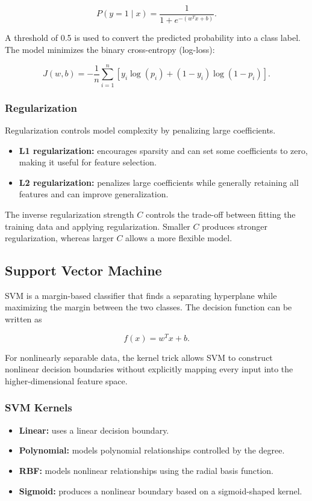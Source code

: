 \documentclass[12pt,a4paper]{article}
\begin{document}
\begin{equation}
P(y=1\mid x)=\frac{1}{1+e^{-(w^Tx+b)}}.
\end{equation}

A threshold of 0.5 is used to convert the predicted probability into a class label. The model minimizes the binary cross-entropy (log-loss):

\begin{equation}
J(w,b)=-\frac{1}{n}\sum_{i=1}^{n}\left[y_i\log(p_i)+(1-y_i)\log(1-p_i)\right].
\end{equation}

\subsubsection*{Regularization}
Regularization controls model complexity by penalizing large coefficients.
\begin{itemize}
    \item \textbf{L1 regularization:} encourages sparsity and can set some coefficients to zero, making it useful for feature selection.
    \item \textbf{L2 regularization:} penalizes large coefficients while generally retaining all features and can improve generalization.
\end{itemize}

The inverse regularization strength \(C\) controls the trade-off between fitting the training data and applying regularization. Smaller \(C\) produces stronger regularization, whereas larger \(C\) allows a more flexible model.

\subsection{Support Vector Machine}
SVM is a margin-based classifier that finds a separating hyperplane while maximizing the margin between the two classes. The decision function can be written as

\begin{equation}
f(x)=w^Tx+b.
\end{equation}

For nonlinearly separable data, the kernel trick allows SVM to construct nonlinear decision boundaries without explicitly mapping every input into the higher-dimensional feature space.

\subsubsection*{SVM Kernels}
\begin{itemize}
    \item \textbf{Linear:} uses a linear decision boundary.
    \item \textbf{Polynomial:} models polynomial relationships controlled by the degree.
    \item \textbf{RBF:} models nonlinear relationships using the radial basis function.
    \item \textbf{Sigmoid:} produces a nonlinear boundary based on a sigmoid-shaped kernel.
\end{itemize}
\end{document}
